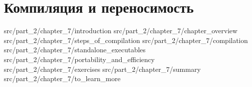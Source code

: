 \chapter{Компиляция и переносимость}
\label{chpt:compilation_and_portability}

 {src/part_2/chapter_7/introduction}
 {src/part_2/chapter_7/chapter_overview}
 {src/part_2/chapter_7/steps_of_compilation}
 {src/part_2/chapter_7/compilation}
 {src/part_2/chapter_7/standalone_executables}
 {src/part_2/chapter_7/portability_and_efficiency}
 {src/part_2/chapter_7/exercises}
 {src/part_2/chapter_7/summary}
 {src/part_2/chapter_7/to_learn_more}